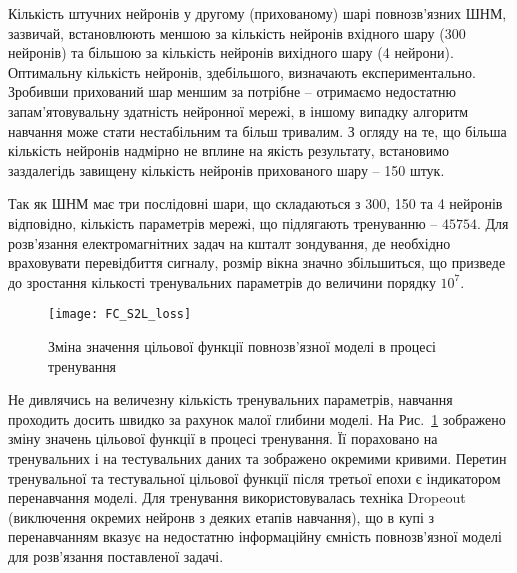 
Кількість штучних нейронів у другому (прихованому) шарі повнозв'язних 
ШНМ, зазвичай, встановлюють меншою за кількість нейронів вхідного шару 
(300 нейронів) та більшою за кількість нейронів вихідного шару (4 нейрони).
Оптимальну кількість нейронів, здебільшого, визначають експериментально.
Зробивши прихований шар меншим за потрібне -- отримаємо недостатню 
запам'ятовувальну здатність нейронної мережі, в іншому випадку алгоритм 
навчання може стати нестабільним та більш тривалим. З огляду на те, що
більша кількість нейронів надмірно не вплине на якість результату, 
встановимо заздалегідь завищену кількість нейронів прихованого шару -- 
150 штук.

Так як ШНМ має три послідовні шари, що складаються з 300, 150 та 4 нейронів 
відповідно, кількість параметрів мережі, що підлягають тренуванню -- 
$ 45754 $. Для розв'язання електромагнітних задач на кшталт зондування, де 
необхідно враховувати перевідбиття сигналу, розмір вікна значно збільшиться, 
що призведе до зростання кількості тренувальних параметрів до величини 
порядку $ 10^7 $.

\begin{figure}[htbp] \begin{center}
\texttt{[image: FC\_S2L\_loss]}
\caption{Зміна значення цільової функції повнозв'язної моделі  
в процесі тренування} \label{fig:fcnn_loss}
\end{center} \end{figure}

Не дивлячись на величезну кількість тренувальних параметрів, навчання 
проходить досить швидко за рахунок малої глибини моделі. 
На Рис.~\ref{fig:fcnn_loss} зображено зміну значень цільової функції в 
процесі тренування. Її пораховано на тренувальних і на тестувальних даних 
та зображено окремими кривими. Перетин тренувальної та тестувальної 
цільової функції після третьої епохи є індикатором перенавчання моделі. 
Для тренування використовувалась техніка Dropeout (виключення окремих 
нейронв з деяких етапів навчання), що в купі з перенавчанням вказує
на недостатню інформаційну ємність повнозв'язної моделі для 
розв'язання поставленої задачі.

